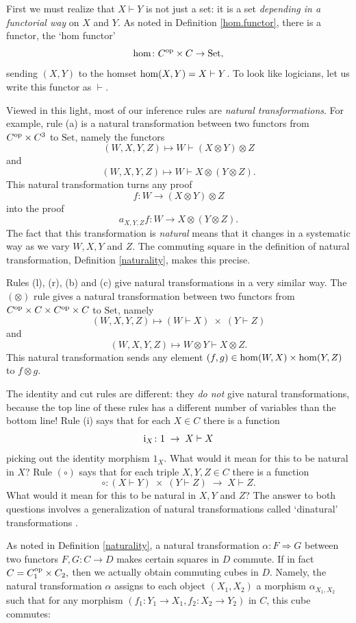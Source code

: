 \documentclass[12pt,twoside,openright]{report}
\newcommand{\Set}{\mathrm{Set}}
\newcommand{\maps}{\colon}
\newcommand{\lHom}{\vdash}
\renewcommand{\hom}{{\rm hom}}
\newcommand{\tensor}{\otimes}
\newcommand{\id}{{\rm i}}
\newcommand{\op}{{\rm op}}
\begin{document}
First we must realize that $X \lHom Y$ is not just a set: it is a set 
{\em depending in a functorial way} on $X$ and $Y$.   As noted in Definition \ref{hom.functor}, there is a functor, the `hom functor'
$$    \hom \maps C^\op \times C \to \Set, $$ 
sending $(X,Y)$ to the homset $\hom(X,Y) = X \lHom Y$.  To look like logicians, let us write this functor as $\lHom$.

Viewed in this light, most of our inference rules are {\it natural transformations}.  For example, rule (a) is a natural transformation between two functors from $C^\op \times C^3$ to $\Set$, namely the functors 
\[        (W,X,Y,Z) \mapsto W \lHom (X \tensor Y) \tensor Z \]
and 
\[        (W,X,Y,Z) \mapsto W \lHom X \tensor (Y \tensor Z) .\]
This natural transformation turns any proof
\[        f \maps W \to (X \tensor Y) \tensor Z \]
into the proof
\[  a_{X,Y,Z} f \maps W \to X \tensor (Y \tensor Z)  .\]
The fact that this transformation is {\it natural} means that it changes in a systematic way as we vary $W,X,Y$ and $Z$.  The commuting square in the definition of natural transformation, Definition \ref{naturality}, makes this precise.

Rules (l), (r), (b) and (c) give natural transformations in a very similar way.   The $(\tensor)$ rule gives a natural transformation between two functors from $C^\op \times C \times C^\op \times C$ 
to $\Set$, namely
\[       (W,X,Y,Z) \mapsto (W \lHom X) \; \times \; (Y \lHom Z) \]
and 
\[       (W,X,Y,Z) \mapsto W \tensor Y \lHom X \tensor Z .\]
This natural transformation sends any element $(f,g) \in 
\hom(W,X) \times \hom(Y,Z)$ to $f \tensor g$. 

The identity and cut rules are different: they {\it do not} give natural transformations, because the top line of these rules has a different number of variables than the bottom line!
Rule (i) says that for each $X \in C$ there is a function 
\[ \id_X \maps 1 \; \to \; X \lHom X \] 
picking out the identity morphism $1_X.$  
What would it mean for this to be natural in $X$?
Rule $(\circ)$ says that for each triple $X,Y,Z \in C$ there is a function
\[     \circ \maps (X \lHom Y) \; \times \; (Y \lHom Z) \; \to \; X \lHom Z .\] 
What would it mean for this to be natural in $X,Y$ and $Z$? 
The answer to both questions involves a generalization of natural transformations called `dinatural' transformations \cite{MacLane}.

As noted in Definition \ref{naturality}, a natural transformation $\alpha \maps F\Rightarrow G$ between two functors 
$F, G \maps C \to D$ makes certain squares in $D$ commute. If in fact $C=C_1^{\op} \times C_2,$ then we actually obtain commuting cubes in $D.$  Namely, the natural transformation $\alpha$ assigns to each object $(X_1, X_2)$ a morphism $\alpha_{X_1,X_2}$ such that for any morphism $(f_1 \maps Y_1\to X_1, f_2 \maps X_2\to Y_2)$ in $C$, this cube commutes:
\end{document}
